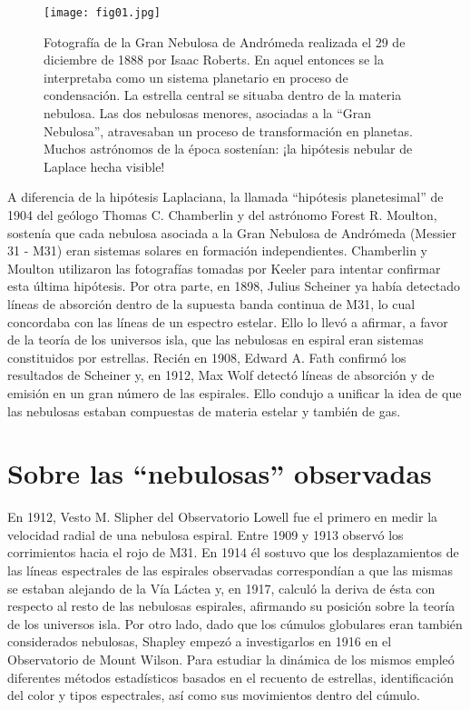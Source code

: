 \documentclass[baaa]{baaa}
\begin{document}
\begin{figure}[!t]
\centering
\texttt{[image: fig01.jpg]}
\caption{Fotografía de la Gran Nebulosa de Andrómeda realizada el 29 de diciembre de 1888 por Isaac Roberts. En aquel entonces se la interpretaba como un sistema planetario en proceso de condensación. La estrella central se situaba dentro de la materia nebulosa. Las dos nebulosas menores, asociadas a la “Gran Nebulosa”, atravesaban un proceso de transformación en planetas. Muchos astrónomos de la época sostenían: ¡la hipótesis nebular de Laplace hecha visible! \citep{1899spss.book.....R}}
\label{Figura1}
\end{figure}

A diferencia de la hipótesis Laplaciana, la llamada “hipótesis planetesimal” de 1904 del geólogo Thomas C. Chamberlin y del astrónomo Forest R. Moulton, sostenía que cada nebulosa asociada a la Gran Nebulosa de Andrómeda (Messier 31 - M31) eran sistemas solares en formación independientes. Chamberlin y Moulton utilizaron las fotografías tomadas por Keeler para intentar confirmar esta última hipótesis. Por otra parte, en 1898, Julius Scheiner ya había detectado líneas de absorción dentro de la supuesta banda continua de M31, lo cual concordaba con las líneas de un espectro estelar. Ello lo llevó a afirmar, a favor de la teoría de los universos isla, que las nebulosas en espiral eran sistemas constituidos por estrellas. Recién en 1908, Edward A. Fath confirmó los resultados de Scheiner y, en 1912, Max Wolf detectó líneas de absorción y de emisión en un gran número de las espirales. Ello condujo a unificar la idea de que las nebulosas estaban compuestas de materia estelar y también de gas.

\section{Sobre las “nebulosas” observadas}

En 1912, Vesto M. Slipher del Observatorio Lowell fue el primero en medir la velocidad radial de una nebulosa espiral. Entre 1909 y 1913 observó los corrimientos hacia el rojo de M31. En 1914 él sostuvo que los desplazamientos de las líneas espectrales de las espirales observadas correspondían a que las mismas se estaban alejando de la Vía Láctea y, en 1917, calculó la deriva de ésta con respecto al resto de las nebulosas espirales, afirmando su posición sobre la teoría de los universos isla. Por otro lado, dado que los cúmulos globulares eran también considerados nebulosas, Shapley empezó a investigarlos en 1916 en el Observatorio de Mount Wilson. Para estudiar la dinámica de los mismos empleó diferentes métodos estadísticos basados en el recuento de estrellas, identificación del color y tipos espectrales, así como sus movimientos dentro del cúmulo.
\end{document}
